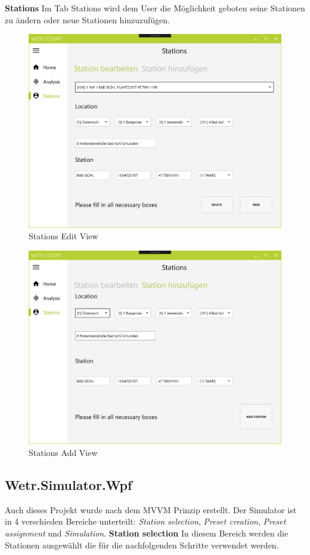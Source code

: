 \textbf{Stations}\newline
Im Tab Stations wird dem User die Möglichkeit geboten seine Stationen zu ändern oder neue Stationen hinzuzufügen.

\begin{figure}[H]
\centering
\includegraphics[width=.7\textwidth]{pictures/Cockpit/Cockpit_4.png}
\caption{Stations Edit View}
\label{fig:Wetr.Cockpit.Wpf.Station.Edit}
\end{figure}
\raggedright

\begin{figure}[H]
\centering
\includegraphics[width=.7\textwidth]{pictures/Cockpit/Cockpit_5.png}
\caption{Stations Add View}
\label{fig:Wetr.Cockpit.Wpf.Station.Add}
\end{figure}
\raggedright

\newpage
\subsection{Wetr.Simulator.Wpf}
Auch dieses Projekt wurde nach dem MVVM Prinzip erstellt.
Der Simulator ist in 4 verschieden Bereiche unterteilt: \textit{Station selection}, \textit{Preset creation}, \textit{Preset assignment} und \textit{Simulation}.
\newline
\newline
\textbf{Station selection}\newline
In diesem Bereich werden die Stationen ausgewählt die für die nachfolgenden Schritte verwendet werden.

